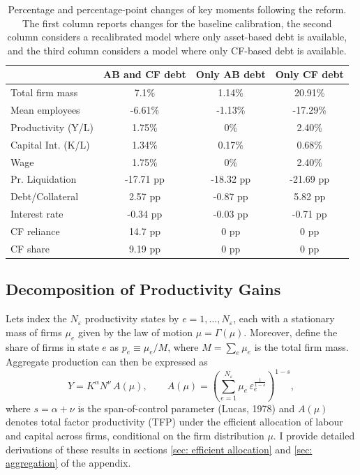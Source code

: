 \documentclass[12pt]{article}
\begin{document}
\begin{table}[H]
    \centering
    \begin{tabular}{lccc}
    & \textbf{AB and CF debt} & \textbf{Only AB debt} & \textbf{Only CF debt} \\    
    \toprule
    Total firm mass & 7.1\% & 1.14\% & 20.91\% \\  
    Mean employees & -6.61\% & -1.13\% & -17.29\% \\  
    Productivity (Y/L) & 1.75\% & 0\% & 2.40\% \\  
    Capital Int. (K/L) & 1.34\% & 0.17\% & 0.68\% \\  
    Wage & 1.75\% & 0\% & 2.40\% \vspace{2mm} \\  
    Pr. Liquidation & -17.71 pp & -18.32 pp & -21.69 pp \\  
    Debt/Collateral & 2.57 pp & -0.87 pp & 5.82 pp \\  
    Interest rate & -0.34 pp & -0.03 pp & -0.71 pp \\  
    CF reliance & 14.7 pp & 0 pp & 0 pp \\    
    CF share & 9.19 pp & 0 pp & 0 pp \\  
    \bottomrule
    \end{tabular}
    \caption{\small Percentage and percentage-point changes of key moments following the reform. The first column reports changes for the baseline calibration, the second column considers a recalibrated model where only asset-based debt is available, and the third column considers a model where only CF-based debt is available.}
    \label{tab:percentage_changes}
\end{table}


\subsection{Decomposition of Productivity Gains}

Lets index the $N_\varepsilon$ productivity states by $e=1,\dots,N_\varepsilon$, each with a stationary mass of firms $\mu_e$ given by the law of motion $\mu=\Gamma(\mu)$. Moreover, define the share of firms in state $e$ as $p_e \equiv \mu_e/M$, where $M=\sum_e \mu_e$ is the total firm mass. Aggregate production can then be expressed as
$$ Y = K^{\alpha}N^{\nu}\,A(\mu),  \qquad 
   A(\mu)=\left(\sum_{e=1}^{N_\varepsilon}\mu_e\,\varepsilon_e^{\tfrac{1}{1-s}}\right)^{1-s}, $$
where $s=\alpha+\nu$ is the span-of-control parameter (Lucas, 1978) and $A(\mu)$ denotes total factor productivity (TFP) under the efficient allocation of labour and capital across firms, conditional on the firm distribution $\mu$. I provide detailed derivations of these results in sections \ref{sec: efficient allocation} and \ref{sec: aggregation} of the appendix.
\end{document}
